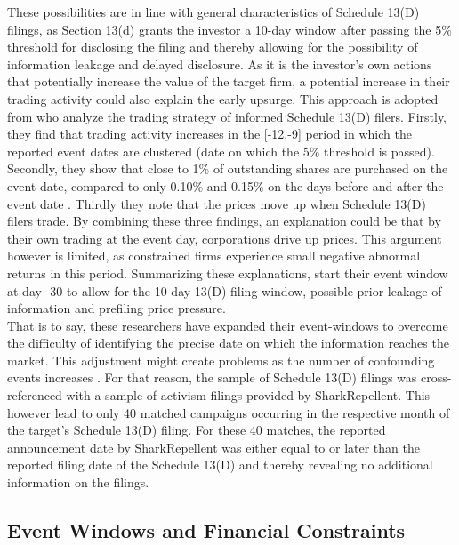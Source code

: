 \documentclass[12pt]{article}
\begin{document}
These possibilities are in line with general characteristics of Schedule 13(D) filings, as Section 13(d) grants the investor a 10-day window after passing the 5\% threshold for disclosing the filing and thereby allowing for the possibility of information leakage and delayed disclosure. 
As it is the investor's own actions that potentially increase the value of the target firm, a potential increase in their trading activity could also explain the early upsurge. This approach is adopted from  \citet[p.1561]{Collin-Dufresne2015} who analyze the trading strategy of informed Schedule 13(D) filers. Firstly, they find that trading activity increases in the [-12,-9] period in which the reported event dates are clustered (date on which the 5\% threshold is passed). Secondly, they show that close to 1\% of outstanding shares are purchased on the event date, compared to only 0.10\% and 0.15\% on the days before and after the event date \citep[p.1561]{Collin-Dufresne2015}. Thirdly they note that the prices move up when Schedule 13(D) filers trade. By combining these three findings, an explanation could be that by their own trading at the event day, corporations drive up prices. This argument however is limited, as constrained firms experience small negative abnormal returns in this period. Summarizing these explanations, \citet[p.207]{Klein2009} start their event window at day -30 to allow for the 10-day 13(D) filing window, possible prior leakage of information and prefiling price pressure.\\
That is to say, these researchers have expanded their event-windows to overcome the difficulty of identifying the precise date on which the information reaches the market. This adjustment might create problems as the number of confounding events increases \citep[p.352]{mcwilliams1999}. For that reason, the sample of Schedule 13(D) filings was cross-referenced with a sample of activism filings provided by SharkRepellent. This however lead to only 40 matched campaigns occurring in the respective month of the target's Schedule 13(D) filing. For these 40 matches, the reported announcement date by SharkRepellent was either equal to or later than the reported filing date of the Schedule 13(D) and thereby revealing no additional information on the filings.

\subsection{Event Windows and Financial Constraints}
\end{document}
